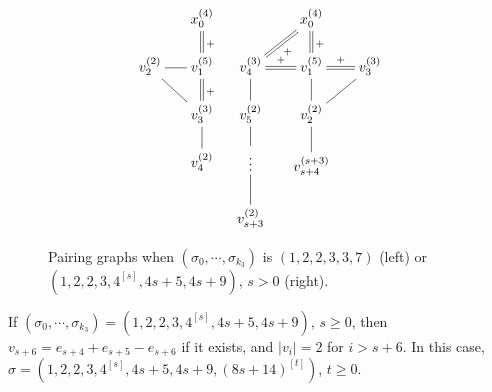 \begin{figure}
	\begin{align*}
	\xymatrix@R1.5em@C1.5em{
		& x_0^{(4)} \ar@{=}[d]^{+} \\
		v_2^{(2)} \ar@{-}[r] \ar@{-}[dr] & v_1^{(5)} \ar@{=}[d]^{+} \\
		& v_{3}^{(3)}\ar@{-}[d]\\
                & v_4^{(2)}\\
	}
	&&
	\xymatrix@R1.5em@C1.5em{
		& x_0^{(4)} \ar@{=}[d]^{+} \ar@{=}[dl]^{+} & \\
		v_4^{(3)}\ar@{=}[r]^{+}\ar@{-}[d] & v_1^{(5)} \ar@{=}[r]^{+} \ar@{-}[d] & v_3^{(3)} \ar@{-}[dl] \\
		v_5^{(2)}\ar@{-}[d] & v_{2}^{(2)} \ar@{-}[d] &  \\
		\vdots & v_{s+4}^{(s+3)} & \\
		v_{s+3}^{(2)}\ar@{-}[u] 
	}
	\end{align*}
	\caption{Pairing graphs when $(\sigma_0, \cdots, \sigma_{k_3})$ is $(1,2,2,3,3,7)$ (left) or $(1,2,2,3,4^{[s]},4s+5, 4s+9)$, $s>0$ (right).}
	\label{fig:case1 1223 G(S)}
\end{figure}

\begin{prop}\label{2k1=3}
		If $(\sigma_0, \cdots, \sigma_{k_3})=(1,2,2,3,4^{[s]},4s+5, 4s+9)$, $s\ge0$, then $v_{s+6}=e_{s+4}+e_{s+5}-e_{s+6}$ if it exists, and $|v_i|=2$ for $i>s+6$. In this case, $\sigma = (1,2,2,3,4^{[s]},4s+5, 4s+9, (8s+14)^{[t]})$, $t\ge0$.
\end{prop}
	

